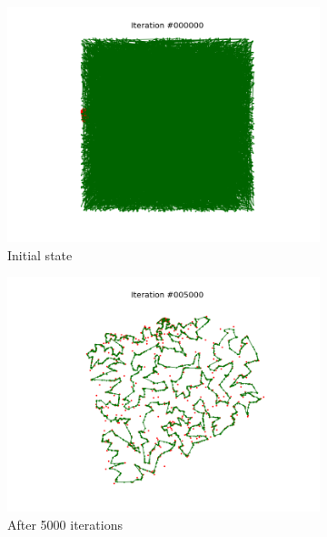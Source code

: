 \documentclass[11pt]{article}
\begin{document}
\begin{figure}
\centering
\begin{subfigure}{.33\textwidth}
  \centering
  \includegraphics[trim={4cm 2cm 4cm 2cm}, clip=true,
  width=\linewidth]{u_0.png}
  \caption{Initial state}
\end{subfigure}%
\begin{subfigure}{.33\textwidth}
  \centering
  \includegraphics[trim={4cm 2cm 4cm 2cm}, clip=true,width=\linewidth]{u_5000.png}
  \caption{After 5000 iterations}
\end{subfigure}
\begin{subfigure}{.33\textwidth}
  \centering

\end{subfigure}
\end{figure}
\end{document}
